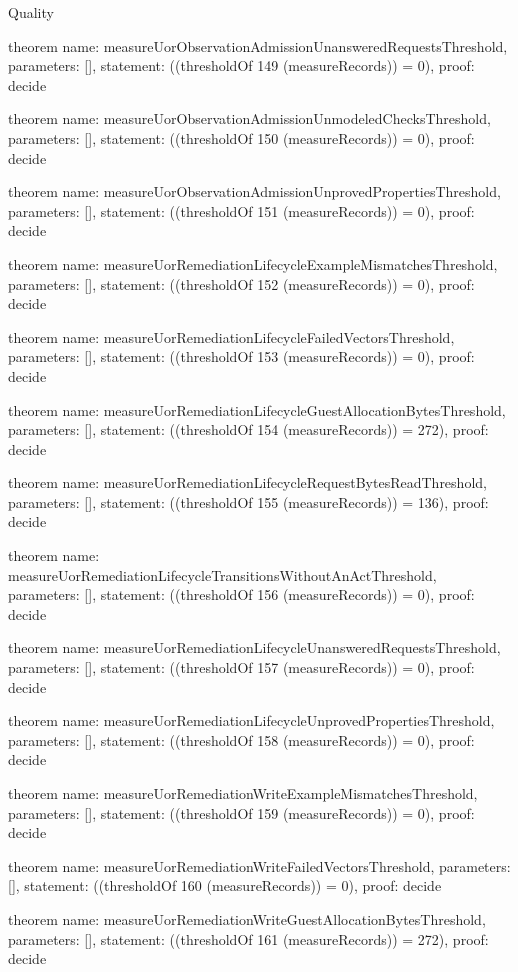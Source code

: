 \begin{lexlean}{Quality}
\begin{semanticmodule}
theorem{
  name: measureUorObservationAdmissionUnansweredRequestsThreshold,
  parameters: [],
  statement: ((thresholdOf 149 (measureRecords)) = 0),
  proof: decide{}
}

theorem{
  name: measureUorObservationAdmissionUnmodeledChecksThreshold,
  parameters: [],
  statement: ((thresholdOf 150 (measureRecords)) = 0),
  proof: decide{}
}

theorem{
  name: measureUorObservationAdmissionUnprovedPropertiesThreshold,
  parameters: [],
  statement: ((thresholdOf 151 (measureRecords)) = 0),
  proof: decide{}
}

theorem{
  name: measureUorRemediationLifecycleExampleMismatchesThreshold,
  parameters: [],
  statement: ((thresholdOf 152 (measureRecords)) = 0),
  proof: decide{}
}

theorem{
  name: measureUorRemediationLifecycleFailedVectorsThreshold,
  parameters: [],
  statement: ((thresholdOf 153 (measureRecords)) = 0),
  proof: decide{}
}

theorem{
  name: measureUorRemediationLifecycleGuestAllocationBytesThreshold,
  parameters: [],
  statement: ((thresholdOf 154 (measureRecords)) = 272),
  proof: decide{}
}

theorem{
  name: measureUorRemediationLifecycleRequestBytesReadThreshold,
  parameters: [],
  statement: ((thresholdOf 155 (measureRecords)) = 136),
  proof: decide{}
}

theorem{
  name: measureUorRemediationLifecycleTransitionsWithoutAnActThreshold,
  parameters: [],
  statement: ((thresholdOf 156 (measureRecords)) = 0),
  proof: decide{}
}

theorem{
  name: measureUorRemediationLifecycleUnansweredRequestsThreshold,
  parameters: [],
  statement: ((thresholdOf 157 (measureRecords)) = 0),
  proof: decide{}
}

theorem{
  name: measureUorRemediationLifecycleUnprovedPropertiesThreshold,
  parameters: [],
  statement: ((thresholdOf 158 (measureRecords)) = 0),
  proof: decide{}
}

theorem{
  name: measureUorRemediationWriteExampleMismatchesThreshold,
  parameters: [],
  statement: ((thresholdOf 159 (measureRecords)) = 0),
  proof: decide{}
}

theorem{
  name: measureUorRemediationWriteFailedVectorsThreshold,
  parameters: [],
  statement: ((thresholdOf 160 (measureRecords)) = 0),
  proof: decide{}
}

theorem{
  name: measureUorRemediationWriteGuestAllocationBytesThreshold,
  parameters: [],
  statement: ((thresholdOf 161 (measureRecords)) = 272),
  proof: decide{}
}


\end{semanticmodule}
\end{lexlean}
